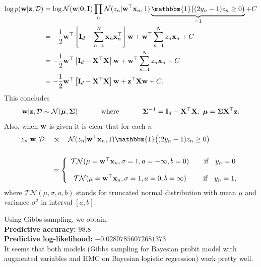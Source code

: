 \documentclass[12pt, fullpage,letterpaper]{article}
\begin{document}
\begin{enumerate}
\begin{enumerate}
{\begin{align*}
\log p(\w| \z, \Dcal) & = \log\N(\w|\0, \I)\prod_n \N(z_n|\w^\top \x_n, 1)\underbrace{\mathbbm{1}\big((2y_n-1)z_n\ge 0\big)}_{ = 1} + C\\
& = - \frac{1}{2}\w^\top \left[\mathbf{I}_d - \sum\limits_{n=1}^N \x_n\x_n^\top\right]\w + \w^\top\sum\limits_{n = 1}^N z_n  \x_n + C\\
& = - \frac{1}{2}\w^\top \left[ \mathbf{I}_d - \X^\top \X \right]\w + \w^\top \sum\limits_{n = 1}^N z_n  \x_n + C\\
& = - \frac{1}{2}\w^\top \left[ \mathbf{I}_d - \X^\top \X \right]\w +  \z^\top  \X \w + C.
\end{align*}
This concludes 
$${\bf w}| {\bf z}, \mathcal{D} \sim \mathcal{N}(\boldsymbol{\mu}, \boldsymbol{\Sigma})\quad\quad \quad \text{ where } \quad\quad \quad \boldsymbol{\Sigma}^{-1} = \mathbf{I}_d - {\bf X}^\top {\bf X},\  \boldsymbol{\mu} = \boldsymbol{\Sigma}{\bf X}^\top{\bf z}.
$$
Also, when ${\bf w}$ is given it is clear that for each $n$
\begin{align*}
z_n |\w,\Dcal\quad & \propto \quad \N(z_n|\w^\top \x_n, 1)\mathbbm{1}\big((2y_n-1)z_n\ge 0\big)\\ \\
& = \left\{\begin{array}{cc}
\mathcal{TN}(\mu =\w^\top \x_n , \sigma =1 , a =-\infty , b = 0 ) & \quad \text{if} \quad y_n = 0\\ \\
\mathcal{TN}(\mu =\w^\top \x_n , \sigma =1 , a =0 , b =\infty  ) &  \quad \text{if} \quad y_n = 1,\\
\end{array}\right.
\end{align*}
where $\mathcal{TN}(\mu,\sigma, a, b)$ stands for  truncated normal distribution with mean $\mu$ and variance $\sigma^2$ in interval $[a,b]$.

Using Gibbs sampling, we obtain:\\
{\bf Predictive accuracy: } $98.8$ \\
{\bf Predictive log-likelihood: } $-0.02897856072681373$\\
It seems that both models (Gibbs sampling for Bayesian probit model with augmented variables and HMC on Bayesian logistic regression) work pretty well. 
}
		

\end{enumerate}
\end{enumerate}
\end{document}
